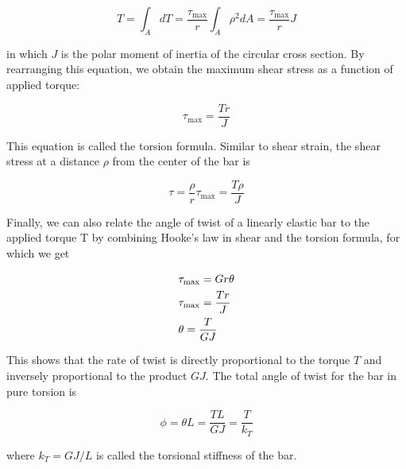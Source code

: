 \documentclass[
10pt,
a4paper,
openany,
svgnames,
]{book}
\begin{document}
\[T = \int_A {dT}  = \frac{\tau _{\max }}{r}\int_A \rho ^2dA  = \frac{\tau _{\max }}{r}J\]

in which $J$ is the polar moment of inertia of the circular cross section. By rearranging this equation, we obtain the maximum shear stress as a function of applied torque:

\begin{equation}
  \label{eqn: torsional stress formula}
  \tau _{\max } = \frac{Tr}{J}
\end{equation}

This equation is called the torsion formula. Similar to shear strain, the shear stress at a distance $\rho$ from the center of the bar is

\begin{equation}
  \tau  = \frac{\rho }{r}\tau _{\max } = \frac{T\rho }{J}
\end{equation}

Finally, we can also relate the angle of twist of a linearly elastic bar to the applied torque T by combining Hooke’s law in shear and the torsion formula, for which we get

\[\begin{gathered}
    \tau _{\max } = Gr\theta \\
    \tau _{\max } = \frac{Tr}{J} \hfill \\
    \theta  = \frac{T}{GJ} \hfill \\ 
  \end{gathered} \]

This shows that the rate of twist is directly proportional to the torque $T$ and inversely proportional to the product $GJ$. The total angle of twist for the bar in pure torsion is

\begin{equation}
  \phi  = \theta L = \frac{TL}{GJ} = \frac{T}{k_T}
\end{equation}

where $k_T = GJ/L$ is called the torsional stiffness of the bar.
\end{document}
